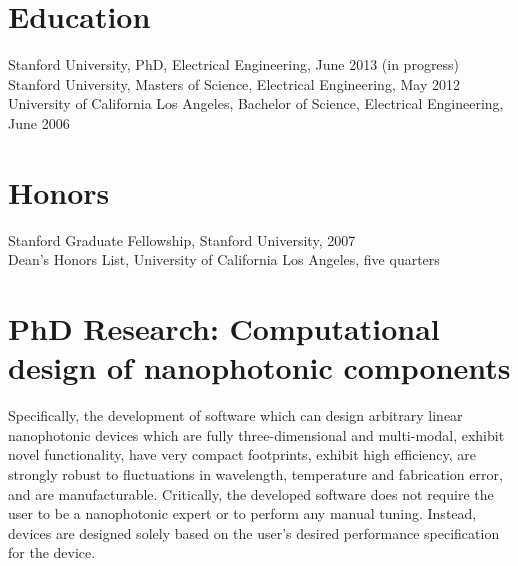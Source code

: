 \documentclass{res}
\begin{document}
 

\address{\texttt{jesselu@stanford.edu} \\ 66 Newell Rd. Apt. O \\ East Palo Alto, CA \\ (408) 568-9356}
                                  
\begin{resume}

\section{Education}          
    Stanford University, PhD, Electrical Engineering, June 2013 (in progress) \\
    Stanford University, Masters of Science, Electrical Engineering, May 2012 \\
    University of California Los Angeles, Bachelor of Science, Electrical Engineering, June 2006

\section{Honors}
    Stanford Graduate Fellowship, Stanford University, 2007 \\
    Dean's Honors List, University of California Los Angeles, five quarters

\section{PhD Research: Computational design of nanophotonic components}
Specifically, the development of software which can
    design arbitrary linear nanophotonic devices which 
    are fully three-dimensional and multi-modal,
    exhibit novel functionality,
    have very compact footprints,
    exhibit high efficiency, 
    are strongly robust to fluctuations in 
    wavelength, temperature and fabrication error, and
    are manufacturable.
Critically, the developed software 
    does not require the user to be a nanophotonic expert or 
    to perform any manual tuning. 
Instead, devices are designed
    solely based on the user's desired performance specification for the device.


\end{resume}
\end{document}
